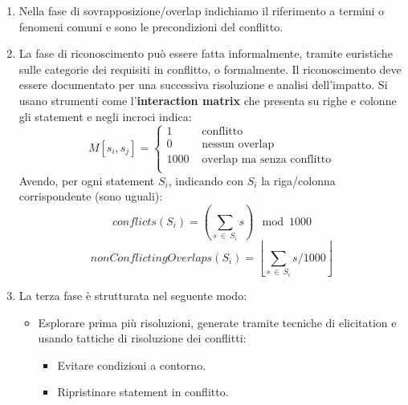 \begin{enumerate}
      \item Nella fase di sovrapposizione/overlap indichiamo il riferimento a
            termini o fenomeni comuni e sono le precondizioni del conflitto.
      \item La fase di riconoscimento può essere fatta informalmente, tramite
            euristiche sulle categorie dei requisiti in conflitto, o formalmente.
            Il riconoscimento deve essere documentato per una successiva risoluzione
            e analisi dell'impatto. Si usano strumenti come l'\textbf{interaction
                  matrix} che presenta su righe e colonne gli statement e
            negli incroci indica:
            \begin{equation}
                  M[s_i,s_j] = \begin{cases}
                        1    & \text{ conflitto}                  \\
                        0    & \text{ nessun overlap}             \\
                        1000 & \text{ overlap ma senza conflitto} \\
                  \end{cases}
            \end{equation}
            Avendo, per ogni statement $S_i$, indicando con $S_i$ la riga/colonna
            corrispondente (sono uguali):
            \begin{equation}
                  conflicts(S_i) = \left(\sum_{s \ \in \ S_i} s \right) \mod 1000
            \end{equation}
            \begin{equation}
                  nonConflictingOverlaps(S_i) = \left\lfloor \sum_{s \ \in \
                        S_i} s / 1000 \right\rfloor
            \end{equation}
      \item La terza fase è strutturata nel seguente modo:
            \begin{itemize}
                  \item Esplorare prima più risoluzioni, generate tramite tecniche
                        di elicitation e usando tattiche di risoluzione dei conflitti:
                        \begin{itemize}
                              \item Evitare condizioni a contorno.
                              \item Ripristinare statement in conflitto.

\end{itemize}
\end{itemize}
\end{enumerate}
